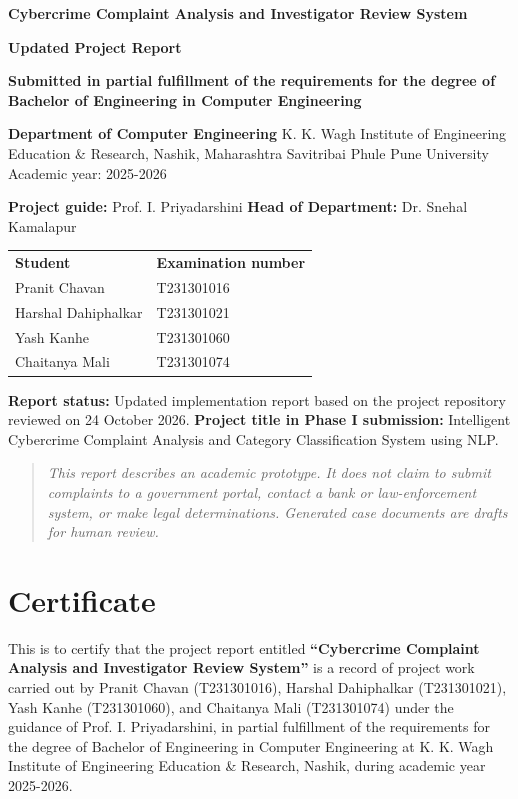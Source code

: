 \documentclass[12pt,a4paper,oneside]{report}
\begin{document}
\begin{titlepage}\centering\vspace*{25mm}
{\Huge\bfseries\color{reportnavy} Cybercrime Complaint Analysis and Investigator Review System\par}
\vspace{12mm}
{\Large\bfseries Updated Project Report\par}\vspace{7mm}
\textbf{Submitted in partial fulfillment of the requirements for the degree of Bachelor of Engineering in Computer Engineering}

\textbf{Department of Computer Engineering} K. K. Wagh Institute of Engineering Education \& Research, Nashik, Maharashtra Savitribai Phule Pune University Academic year: 2025-2026

\textbf{Project guide:} Prof. I. Priyadarshini \textbf{Head of Department:} Dr. Snehal Kamalapur

\begin{tabular}{p{}p{}}
\textbf{Student} & \textbf{Examination number} \\
Pranit Chavan & T231301016 \\
Harshal Dahiphalkar & T231301021 \\
Yash Kanhe & T231301060 \\
Chaitanya Mali & T231301074 \\
\end{tabular}
\textbf{Report status:} Updated implementation report based on the project repository reviewed on 24 October 2026. \textbf{Project title in Phase I submission:} Intelligent Cybercrime Complaint Analysis and Category Classification System using NLP.

\begin{quote}\itshape This report describes an academic prototype. It does not claim to submit complaints to a government portal, contact a bank or law-enforcement system, or make legal determinations. Generated case documents are drafts for human review.\end{quote}
\end{titlepage}
\clearpage\chapter*{Certificate}
This is to certify that the project report entitled \textbf{``Cybercrime Complaint Analysis and Investigator Review System''} is a record of project work carried out by Pranit Chavan (T231301016), Harshal Dahiphalkar (T231301021), Yash Kanhe (T231301060), and Chaitanya Mali (T231301074) under the guidance of Prof. I. Priyadarshini, in partial fulfillment of the requirements for the degree of Bachelor of Engineering in Computer Engineering at K. K. Wagh Institute of Engineering Education \& Research, Nashik, during academic year 2025-2026.
\end{document}

